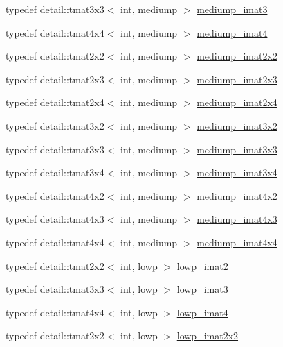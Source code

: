 \begin{CompactItemize}
typedef detail::tmat3x3$<$ int, mediump $>$ \hyperlink{group__gtc__matrix__integer_g6b438ab863af0122b532adc93b89105e}{mediump\_\-imat3}
\item 
typedef detail::tmat4x4$<$ int, mediump $>$ \hyperlink{group__gtc__matrix__integer_gbf1a0fd4c85a21f67535b737e1feb355}{mediump\_\-imat4}
\item 
typedef detail::tmat2x2$<$ int, mediump $>$ \hyperlink{group__gtc__matrix__integer_g472222f6e3754124ee9cb64acaaedac1}{mediump\_\-imat2x2}
\item 
typedef detail::tmat2x3$<$ int, mediump $>$ \hyperlink{group__gtc__matrix__integer_gbc92c714c2d257213c5b0771669df177}{mediump\_\-imat2x3}
\item 
typedef detail::tmat2x4$<$ int, mediump $>$ \hyperlink{group__gtc__matrix__integer_g90b020de8489a1d4424c0ffcc17c83dd}{mediump\_\-imat2x4}
\item 
typedef detail::tmat3x2$<$ int, mediump $>$ \hyperlink{group__gtc__matrix__integer_g2a90775c74656b8a825f24d510f0ea5d}{mediump\_\-imat3x2}
\item 
typedef detail::tmat3x3$<$ int, mediump $>$ \hyperlink{group__gtc__matrix__integer_gc5ee8dc182055bb0a00a90c031d4a714}{mediump\_\-imat3x3}
\item 
typedef detail::tmat3x4$<$ int, mediump $>$ \hyperlink{group__gtc__matrix__integer_gaac79be4db34dde570c3331ffe728d55}{mediump\_\-imat3x4}
\item 
typedef detail::tmat4x2$<$ int, mediump $>$ \hyperlink{group__gtc__matrix__integer_gcdae7d6ae4820756c62c2b5fd5c0370a}{mediump\_\-imat4x2}
\item 
typedef detail::tmat4x3$<$ int, mediump $>$ \hyperlink{group__gtc__matrix__integer_g5032ee978a55aa0db4842d5c3cbeade0}{mediump\_\-imat4x3}
\item 
typedef detail::tmat4x4$<$ int, mediump $>$ \hyperlink{group__gtc__matrix__integer_gfa2df6be3aad055867b9bfea34e9c4a0}{mediump\_\-imat4x4}
\item 
typedef detail::tmat2x2$<$ int, lowp $>$ \hyperlink{group__gtc__matrix__integer_ge0df4bc278c1a958a32af9ac82c47630}{lowp\_\-imat2}
\item 
typedef detail::tmat3x3$<$ int, lowp $>$ \hyperlink{group__gtc__matrix__integer_g149b90591e7275193c85cc08acbf0024}{lowp\_\-imat3}
\item 
typedef detail::tmat4x4$<$ int, lowp $>$ \hyperlink{group__gtc__matrix__integer_g7c687f14d923e05d5cf14aac41d10993}{lowp\_\-imat4}
\item 
typedef detail::tmat2x2$<$ int, lowp $>$ \hyperlink{group__gtc__matrix__integer_g05307630bc68a62132a82d1886a0b5e2}{lowp\_\-imat2x2}

\end{CompactItemize}
